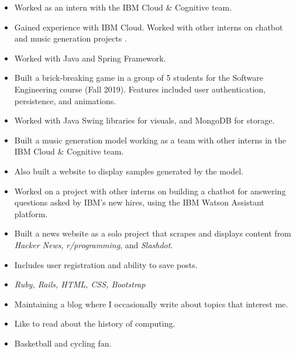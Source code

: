 
\begin{itemize}
    \item Worked as an intern with the IBM Cloud \& Cognitive team. 
    \item Gained experience with IBM Cloud. Worked with other interns on chatbot and music generation projects . 
\end{itemize}

\begin{itemize}
    \item Worked with Java and Spring Framework. 
\end{itemize}


\begin{itemize}
	\item Built a brick-breaking game in a group of 5 students for the Software Engineering course (Fall 2019). Features included user authentication, persistence, and animations.
	\item Worked with Java Swing libraries for visuals, and MongoDB for storage. 
\end{itemize}

\begin{itemize}
	\item Built a music generation model working as a team with other interns in the IBM Cloud \& Cognitive team.
	\item Also built a website to display samples generated by the model. 
\end{itemize}

\begin{itemize}
	\item Worked on a project with other interns on building a chatbot for answering questions asked by IBM's new hires, using the IBM Watson Assistant platform. 
\end{itemize}

\begin{itemize}
	\item Built a news website as a solo project that scrapes and displays content from \textit{Hacker News}, \textit{r/programming}, and \textit{Slashdot}.
	\item Includes user registration and ability to save posts.
	\item \textit{Ruby, Rails, HTML, CSS, Bootstrap}
\end{itemize}

\begin{itemize}
\item Maintaining a blog where I occasionally write about topics that interest me.
\item Like to read about the history of computing.
\item Basketball and cycling fan.
\end{itemize}


    

